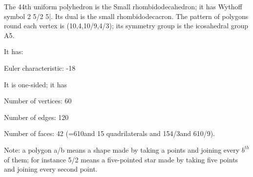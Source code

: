 The 44th uniform polyhedron is the Small rhombidodecahedron; it has Wythoff symbol 2 5/2 5|. Its dual is the small rhombidodecacron. The pattern of polygons round each vertex is (10,4,10/9,4/3); its symmetry group is the icosahedral group A5.\par
It has:\par
Euler characteristic: -18\par
It is one-sided; it has\par
Number of vertices: 60\par
Number of edges:  120\par
Number of faces: 42 (=6{10}and 15 quadrilaterals and 15{4/3}and 6{10/9}).\par
Note: a polygon a/b means a shape made by taking a points and joining every $b^{th}$  of them; for instance 5/2 means a five-pointed star made by taking five points and joining every second point.